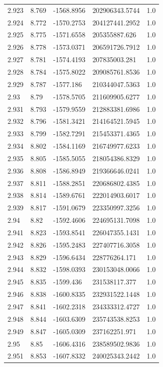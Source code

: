 \begin{tabular}{lllll}
2.923 & 8.769 & -1568.8956 & 202906343.5744 & 1.0 \\
2.924 & 8.772 & -1570.2753 & 204127441.2952 & 1.0 \\
2.925 & 8.775 & -1571.6558 & 205355887.626 & 1.0 \\
2.926 & 8.778 & -1573.0371 & 206591726.7912 & 1.0 \\
2.927 & 8.781 & -1574.4193 & 207835003.281 & 1.0 \\
2.928 & 8.784 & -1575.8022 & 209085761.8536 & 1.0 \\
2.929 & 8.787 & -1577.186 & 210344047.5363 & 1.0 \\
2.93 & 8.79 & -1578.5705 & 211609905.6277 & 1.0 \\
2.931 & 8.793 & -1579.9559 & 212883381.6986 & 1.0 \\
2.932 & 8.796 & -1581.3421 & 214164521.5945 & 1.0 \\
2.933 & 8.799 & -1582.7291 & 215453371.4365 & 1.0 \\
2.934 & 8.802 & -1584.1169 & 216749977.6233 & 1.0 \\
2.935 & 8.805 & -1585.5055 & 218054386.8329 & 1.0 \\
2.936 & 8.808 & -1586.8949 & 219366646.0241 & 1.0 \\
2.937 & 8.811 & -1588.2851 & 220686802.4385 & 1.0 \\
2.938 & 8.814 & -1589.6761 & 222014903.6017 & 1.0 \\
2.939 & 8.817 & -1591.0679 & 223350997.3256 & 1.0 \\
2.94 & 8.82 & -1592.4606 & 224695131.7098 & 1.0 \\
2.941 & 8.823 & -1593.8541 & 226047355.1431 & 1.0 \\
2.942 & 8.826 & -1595.2483 & 227407716.3058 & 1.0 \\
2.943 & 8.829 & -1596.6434 & 228776264.171 & 1.0 \\
2.944 & 8.832 & -1598.0393 & 230153048.0066 & 1.0 \\
2.945 & 8.835 & -1599.436 & 231538117.377 & 1.0 \\
2.946 & 8.838 & -1600.8335 & 232931522.1448 & 1.0 \\
2.947 & 8.841 & -1602.2318 & 234333312.4727 & 1.0 \\
2.948 & 8.844 & -1603.6309 & 235743538.8253 & 1.0 \\
2.949 & 8.847 & -1605.0309 & 237162251.971 & 1.0 \\
2.95 & 8.85 & -1606.4316 & 238589502.9836 & 1.0 \\
2.951 & 8.853 & -1607.8332 & 240025343.2442 & 1.0 \\

\end{tabular}
